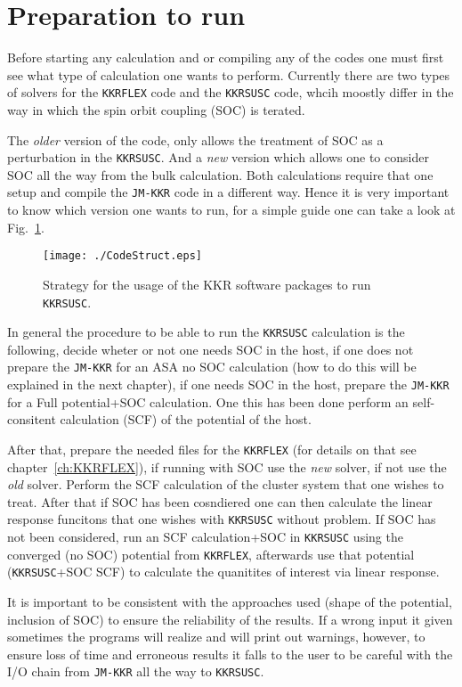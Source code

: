 \documentclass[11pt,fleqn]{book} %
\begin{document}
\section{Preparation to run}
Before starting any calculation and or compiling any of the codes one must first see what type of calculation one wants to perform. Currently there are two types of solvers for the \verb;KKRFLEX; code and the \verb;KKRSUSC; code, whcih moostly differ in the way in which the spin orbit coupling (SOC) is terated. 

The \textit{older} version of the code, only allows the treatment of SOC as a perturbation in the \verb;KKRSUSC;. And a \textit{new} version which allows one to consider SOC all the way from the bulk calculation. Both calculations require that one setup and compile the \verb;JM-KKR; code in a different way. Hence it is very important to know which version one wants to run, for a simple guide one can take a look at Fig.~\ref{fig:CodeStruct}. 
\begin{figure}[ht]
\centering
\texttt{[image: ./CodeStruct.eps]}
\caption{Strategy for the usage of the KKR software packages to run \texttt{KKRSUSC}.\label{fig:CodeStruct}}
\end{figure}

In general the procedure to be able to run the \verb;KKRSUSC; calculation is the following, decide wheter or not one needs SOC in the host, if one does not prepare the \verb;JM-KKR; for an ASA no SOC calculation (how to do this will be explained in the next chapter), if one needs SOC in the host, prepare the \verb;JM-KKR; for a Full potential+SOC calculation. One this has been done perform an self-consitent calculation (SCF) of the potential of the host. 

After that, prepare the needed files for the \verb;KKRFLEX; (for details on that see chapter~\ref{ch:KKRFLEX}), if running with SOC use the \textit{new} solver, if not use the \textit{old} solver. Perform the SCF calculation of the cluster system that one wishes to treat. After that if SOC has been cosndiered one can then calculate the linear response funcitons that one wishes with \verb;KKRSUSC; without problem. If SOC has not been considered, run an SCF calculation+SOC in \verb;KKRSUSC; using the converged (no SOC) potential from \verb;KKRFLEX;, afterwards use that potential (\verb;KKRSUSC;+SOC SCF) to calculate the quanitites of interest via linear response.

It is important to be consistent with the approaches used (shape of the potential, inclusion of SOC) to ensure the reliability of the results. If a wrong input it given sometimes the programs will realize and will print out warnings, however, to ensure loss of time and erroneous results it falls to the user to be careful with the I/O chain from \verb;JM-KKR; all the way to \verb;KKRSUSC;.
\end{document}
